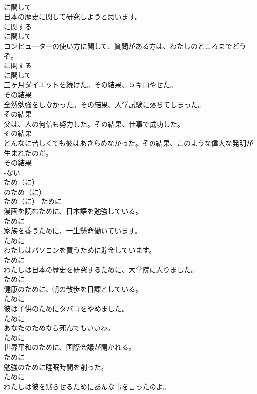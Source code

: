 \documentclass[8pt]{extreport}
\begin{document}
\begin{CJK}{UTF8}{min}
\\	に関して
\\	日本の歴史に関して研究しようと思います。	
\\	に関する 
\\	に関して
\\	コンピューターの使い方に関して、質問がある方は、わたしのところまでどうぞ。	
\\	に関する 
\\	に関して
\\	三ヶ月ダイエットを続けた。その結果、５キロやせた。	
\\	その結果
\\	全然勉強をしなかった。その結果、入学試験に落ちてしまった。	
\\	その結果
\\	父は、人の何倍も努力した。その結果、仕事で成功した。	
\\	その結果
\\	どんなに苦しくても彼はあきらめなかった。その結果、このような偉大な発明が生まれたのだ。	
\\	その結果
\\	-ない
\\	ため（に）	
\\	のため（に）	
\\	ため（に）	ために
\\	漫画を読むために、日本語を勉強している。	
\\	ために
\\	家族を養うために、一生懸命働いています。	
\\	ために
\\	わたしはパソコンを買うために貯金しています。	
\\	ために
\\	わたしは日本の歴史を研究するために、大学院に入りました。	
\\	ために
\\	健康のために、朝の散歩を日課としている。	
\\	ために
\\	彼は子供のためにタバコをやめました。	
\\	ために
\\	あなたのためなら死んでもいいわ。	
\\	ために
\\	世界平和のために、国際会議が開かれる。	
\\	ために
\\	勉強のために睡眠時間を削った。	
\\	ために
\\	わたしは彼を黙らせるためにあんな事を言ったのよ。	

\end{CJK}
\end{document}
